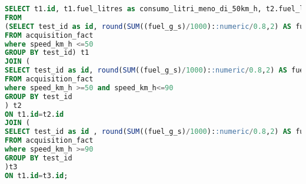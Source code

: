 \begin{lstlisting}[language=SQL]
SELECT t1.id, t1.fuel_litres as consumo_litri_meno_di_50km_h, t2.fuel_litres as consumo_litri_meno_di_90km_h, t3.fuel_litres as consumo_litri_meno_di_130km_h
FROM
(SELECT test_id as id, round(SUM((fuel_g_s)/1000)::numeric/0.8,2) AS fuel_litres, round(AVG(velocity_km_h)::numeric,1) as average_speed_km_h
FROM acquisition_fact
where speed_km_h <=50
GROUP BY test_id) t1
JOIN (
SELECT test_id as id, round(SUM((fuel_g_s)/1000)::numeric/0.8,2) AS fuel_litres, round(AVG(velocity_km_h)::numeric,1) as average_speed_km_h
FROM acquisition_fact
where speed_km_h >=50 and speed_km_h<=90
GROUP BY test_id
) t2
ON t1.id=t2.id
JOIN (
SELECT test_id as id , round(SUM((fuel_g_s)/1000)::numeric/0.8,2) AS fuel_litres, round(AVG(velocity_km_h)::numeric,1) as average_speed_km_h
FROM acquisition_fact
where speed_km_h >=90
GROUP BY test_id
)t3
ON t1.id=t3.id;
\end{lstlisting}

